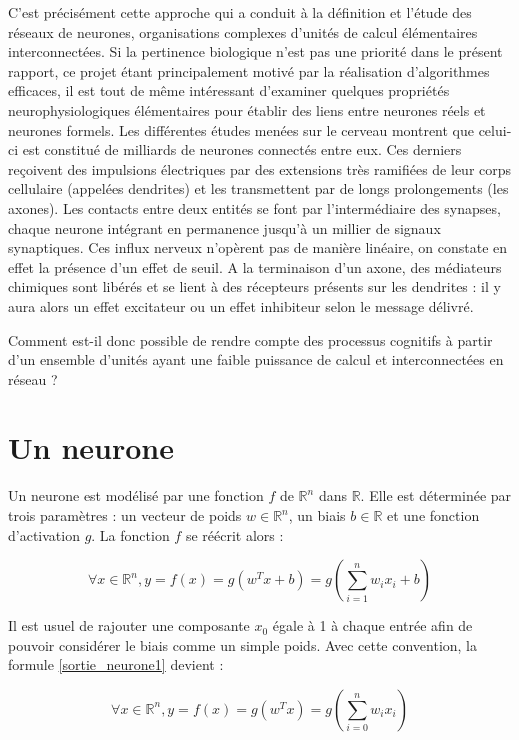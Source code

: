 C'est précisément cette approche qui a conduit à la définition et l'étude des réseaux de neurones, organisations complexes d’unités de calcul élémentaires interconnectées. Si la pertinence biologique n'est pas une priorité dans le présent rapport, ce projet étant principalement motivé par la réalisation d’algorithmes efficaces, il est tout de même intéressant d’examiner quelques propriétés neurophysiologiques élémentaires pour établir des liens entre neurones réels et neurones formels.
Les différentes études menées sur le cerveau montrent que celui-ci est constitué de milliards de neurones connectés entre eux. Ces derniers reçoivent des impulsions électriques par des extensions très ramifiées de leur corps cellulaire (appelées dendrites) et les transmettent par de longs prolongements (les axones). Les contacts entre deux entités se font par l’intermédiaire des synapses, chaque neurone intégrant en permanence jusqu'à un millier de signaux synaptiques. Ces influx nerveux n'opèrent pas de manière linéaire, on constate en effet la présence d’un effet de seuil. A la terminaison d’un axone, des médiateurs chimiques sont libérés et se lient à des récepteurs présents sur les dendrites : il y aura alors un effet excitateur ou un effet inhibiteur selon le message délivré.

Comment est-il donc possible de rendre compte des processus cognitifs à partir d'un ensemble d'unités ayant une faible puissance de calcul et interconnectées en réseau ?

\section{Un neurone}

\begin{definition}[Neurone]
Un neurone est modélisé par une fonction $f$ de $\mathbb{R}^n$ dans $\mathbb{R}$. Elle est déterminée par trois paramètres : un vecteur de poids $w \in \mathbb{R}^n$, un biais $b \in \mathbb{R}$ et une fonction d'activation $g$. La fonction $f$ se réécrit alors :

\begin{equation}
\forall x \in \mathbb{R}^n, y = f(x) = g(w^Tx+b) = g(\sum_{i=1}^{n}{w_ix_i}+b)
\label{sortie_neurone1}
\end{equation}
\end{definition}

\begin{remark}
Il est usuel de rajouter une composante $x_0$ égale à 1 à chaque entrée afin de pouvoir considérer le biais comme un simple poids. Avec cette convention, la formule \ref{sortie_neurone1} devient :

\begin{equation}
\forall x \in \mathbb{R}^n, y = f(x) = g(w^Tx) = g(\sum_{i=0}^{n}{w_ix_i})
\label{sortie_neurone2}
\end{equation}
\end{remark}

